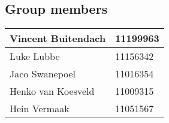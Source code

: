 \begin{center}
\vfill
\section*{Group members}

\begin{tabular}{|l|l|}

\hline
Vincent Buitendach & 11199963\\
\hline
Luke Lubbe & 11156342\\
\hline
Jaco Swanepoel & 11016354\\
\hline
Henko van Koesveld & 11009315\\
\hline
Hein Vermaak & 11051567\\
\hline

\end{tabular}

\end{center}

